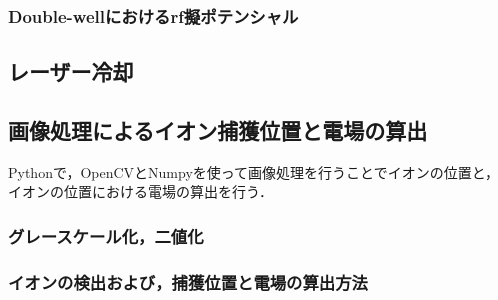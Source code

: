 \subsubsection{Double-wellにおけるrf擬ポテンシャル}
\subsection{レーザー冷却}
\subsection{画像処理によるイオン捕獲位置と電場の算出}
Pythonで，OpenCVとNumpyを使って画像処理を行うことでイオンの位置と，イオンの位置における電場の算出を行う．
\subsubsection{グレースケール化，二値化}
\subsubsection{イオンの検出および，捕獲位置と電場の算出方法}